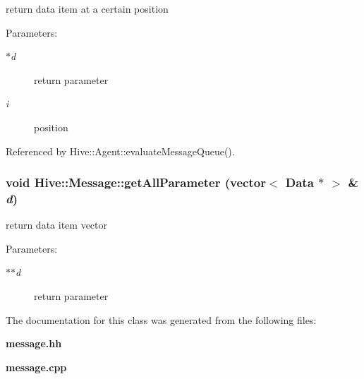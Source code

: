 return data item at a certain position \begin{Desc}
\item[Parameters:]
\begin{description}
\item[{\em $\ast$d}]return parameter \item[{\em i}]position \end{description}
\end{Desc}


Referenced by Hive::Agent::evaluateMessageQueue().
\subsubsection[getAllParameter]{\setlength{\rightskip}{0pt plus 5cm}void Hive::Message::getAllParameter (vector$<$ {\bf Data} $\ast$ $>$ \& {\em d})}\label{classHive_1_1Message_172c036ad596e7cd92892b5c318d0ff9}


return data item vector \begin{Desc}
\item[Parameters:]
\begin{description}
\item[{\em $\ast$$\ast$d}]return parameter \end{description}
\end{Desc}


The documentation for this class was generated from the following files:\begin{CompactItemize}
\item 
{\bf message.hh}\item 
{\bf message.cpp}\end{CompactItemize}
